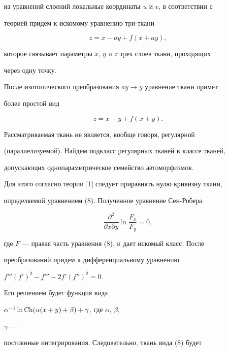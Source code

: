 из уравнений слоений локальные координаты $u$ и $v$, в соответствии с 


теорией придем к искомому уравнению три-ткани 


$$ 


z=x-ay+f(x+ay), 


$$ 


которое связывает параметры $x$, $y$ и $z$ трех слоев ткани, проходящих 


через одну точку. 


 


После изотопического преобразования $ay\to y$ уравнение ткани примет 


более простой вид 


\begin{equation} 


z=x-y+f(x+y). 


\end{equation} 


 


Рассматриваемая ткань не является, вообще говоря, регулярной 


(параллелизуемой). Найдем подкласс регулярных тканей в классе тканей, 


допускающих однопараметрическое семейство автоморфизмов. 


 


Для этого согласно теории [1] следует приравнять нулю кривизну ткани, 


определяемой уравнением (8). Полученное уравнение Сен-Робера 


$$ 


\frac{\partial^2}{\partial x\partial y}\ln 


\frac{F_x}{F_y}=0, 


$$ 


где $F$ --- правая часть уравнения (8), и дает искомый класс. После 


преобразований придем к дифференциальному уравнению 


$f'''(f')^2-f'''-2f'(f'')^2=0$. 


Его решением будет функция вида 


$\alpha^{-1}\ln\operatorname{Ch}(\alpha(x+y)+\beta)+\gamma$, где $\alpha$, $\beta$, 


$\gamma$ --- 


постоянные интегрирования. Следовательно, ткань вида (8) будет 


